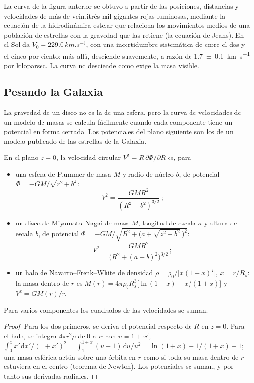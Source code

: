 La curva de la figura anterior se obtuvo a partir de las posiciones, distancias
y velocidades de más de veintitrés mil gigantes rojas luminosas,
mediante la ecuación de la hidrodinámica estelar que relaciona los movimientos medios
de una población de estrellas con la gravedad que las retiene (la ecuación de Jeans).
En el Sol da $V_0 = \qty{229.0}{km.s^{-1}}$, con una incertidumbre sistemática
de entre el dos y el cinco por ciento; más allá, desciende suavemente, a razón de
\qty[separate-uncertainty=true]{1.7 \pm 0.1}{km.s^{-1}} por kiloparsec. La curva no
desciende como exige la masa visible.

\subsection*{Pesando la Galaxia}

La gravedad de un disco no es la de una esfera, pero la curva de velocidades de
un modelo de masas se calcula fácilmente cuando cada componente tiene un potencial en
forma cerrada. Los potenciales del plano siguiente son los de un modelo publicado
de las estrellas de la Galaxia.

\begin{proposition}\label{prop:b3:milky-way-galaxies:models}
En el plano $z = 0$, la velocidad circular $V^2 = R\,\partial\Phi/\partial R$
es, para
\begin{itemize}
\item una esfera de Plummer de masa $M$ y radio de núcleo $b$, de potencial
  $\Phi = -GM/\sqrt{r^2 + b^2}$:
  \[ V^2 = \frac{GMR^2}{(R^2 + b^2)^{3/2}}\,; \]
\item un disco de Miyamoto--Nagai de masa $M$, longitud de escala $a$ y
  altura de escala $b$, de potencial
  $\Phi = -GM\big/\sqrt{R^2 + \bigl(a + \sqrt{z^2 + b^2}\,\bigr)^2}$:
  \[ V^2 = \frac{GMR^2}{\bigl(R^2 + (a + b)^2\bigr)^{3/2}}\,; \]
\item un halo de Navarro--Frenk--White de densidad
  $\rho = \rho_0\big/\bigl[x(1 + x)^2\bigr]$, $x = r/R_s$: la masa dentro de $r$
  es $M(r) = 4\pi\rho_0R_s^3\bigl[\ln(1 + x) - x/(1 + x)\bigr]$ y
  $V^2 = GM(r)/r$.
\end{itemize}
Para varios componentes los cuadrados de las velocidades se suman.
\end{proposition}

\begin{proof}
Para los dos primeros, se deriva el potencial respecto de $R$ en
$z = 0$. Para el halo, se integra $4\pi r^2\rho$ de 0 a $r$: con
$u = 1 + x'$, $\int_0^x x'\,\mathrm{d}x'/(1 + x')^2 =
\int_1^{1+x}(u - 1)\,\mathrm{d}u/u^2 = \ln(1 + x) + 1/(1 + x) - 1$; una
masa esférica actúa sobre una órbita en $r$ como si toda su masa dentro de $r$ estuviera
en el centro (teorema de Newton). Los potenciales se suman, y por tanto sus
derivadas radiales.
\end{proof}

